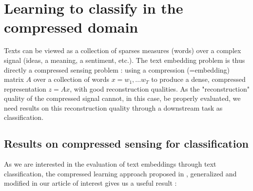 \documentclass{article}
\begin{document}



\section{Learning to classify in the compressed domain}

Texts can be viewed as a collection of sparses measures (words) 
over a complex signal (ideas, a meaning, a sentiment, etc.). The
text embedding problem is thus directly a compressed sensing problem : 
using a compression (=embedding) matrix $A$ over a collection of 
words $x=w_1, ...w_T$ to produce a dense, compressed representation 
$z = Ax$, with good reconstruction qualities. As the "reconstruction"
quality of the compressed signal cannot, in this case, 
be properly evaluated, we need results on this reconstruction
quality through a downstream task as classification. 

\subsection{Results on compressed sensing for classification}

As we are interested in the evaluation of text embeddings through 
text classification, the compressed learning approach proposed 
in \cite{Calderbank2009CompressedL}, generalized and modified in 
our article of interest \cite{arora2018sensing} gives us a useful result :
\end{document}
